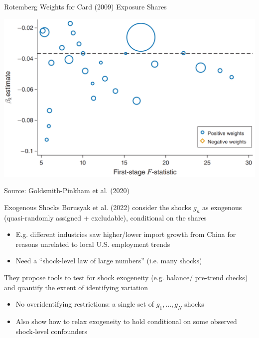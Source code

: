 \documentclass{beamer}
\begin{document}
\begin{frame}{Rotemberg Weights for Card (2009) Exposure Shares}
\begin{center}
\includegraphics[scale=0.3]{./lecture_includes/card_weights.png}
\end{center}
\vspace{-0.3cm}
Source: Goldsmith-Pinkham et al. (2020)
\end{frame}

\begin{frame}{Exogenous Shocks}
Borusyak et al. (2022) consider the shocks $g_n$ as exogenous (quasi-randomly assigned + excludable), conditional on the shares\smallskip
\begin{itemize}
\item E.g. different industries saw higher/lower import growth from China for reasons unrelated to local U.S. employment trends\smallskip
\item Need a ``shock-level law of large numbers'' (i.e. many shocks)
\end{itemize}\bigskip\pause{}

They propose tools to test for shock exogeneity (e.g. balance/ pre-trend checks) and quantify the extent of identifying variation \smallskip
\begin{itemize}
\item No overidentifying restrictions: a single set of $g_1,\dots,g_N$ shocks \smallskip
\item Also show how to relax exogeneity to hold conditional on some observed shock-level confounders
\end{itemize}

\end{frame}
\end{document}
